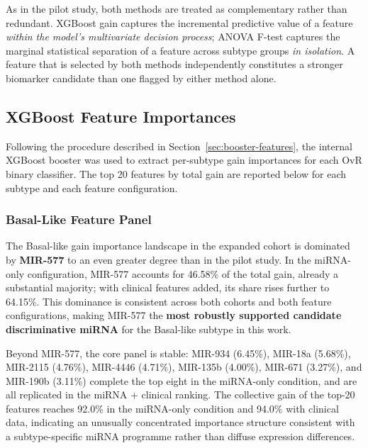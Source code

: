 As in the pilot study, both methods are treated as complementary rather than
redundant. XGBoost gain captures the incremental predictive value of a feature
\textit{within the model's multivariate decision process}; ANOVA F-test captures the
marginal statistical separation of a feature across subtype groups \textit{in
isolation}. A feature that is selected by both methods independently constitutes a
stronger biomarker candidate than one flagged by either method alone.

\subsection{XGBoost Feature Importances}
\label{sec:expanded_booster}

Following the procedure described in Section~\ref{sec:booster-features}, the
internal XGBoost booster was used to extract per-subtype gain importances for each
OvR binary classifier. The top 20 features by total gain are reported below for each
subtype and each feature configuration.

\subsubsection{Basal-Like Feature Panel}

The Basal-like gain importance landscape in the expanded cohort is dominated by
\textbf{MIR-577} to an even greater degree than in the pilot study. In the
miRNA-only configuration, MIR-577 accounts for 46.58\% of the total gain, already
a substantial majority; with clinical features added, its share rises further to
64.15\%. This dominance is consistent across both cohorts and both feature
configurations, making MIR-577 the \textbf{most robustly supported candidate
discriminative miRNA} for the Basal-like subtype in this work.

Beyond MIR-577, the core panel is stable: MIR-934 (6.45\%), MIR-18a (5.68\%),
MIR-2115 (4.76\%), MIR-4446 (4.71\%), MIR-135b (4.00\%), MIR-671 (3.27\%), and
MIR-190b (3.11\%) complete the top eight in the miRNA-only condition, and are all
replicated in the miRNA + clinical ranking. The collective gain of the top-20
features reaches 92.0\% in the miRNA-only condition and 94.0\% with clinical data,
indicating an unusually concentrated importance structure consistent with a
subtype-specific miRNA programme rather than diffuse expression differences.

